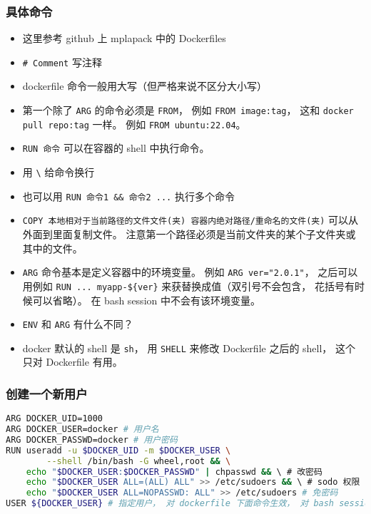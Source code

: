 \subsubsection{具体命令}
\begin{itemize}
\item 这里参考 github 上 mplapack 中的 Dockerfiles
\item \verb`# Comment` 写注释
\item dockerfile 命令一般用大写（但严格来说不区分大小写）
\item 第一个除了 \verb`ARG` 的命令必须是 \verb`FROM`， 例如 \verb`FROM image:tag`， 这和 \verb`docker pull repo:tag` 一样。 例如 \verb`FROM ubuntu:22.04`。
\item \verb`RUN 命令` 可以在容器的 shell 中执行命令。
\item 用 \verb`\` 给命令换行
\item 也可以用 \verb`RUN 命令1 && 命令2 ...` 执行多个命令
\item \verb`COPY 本地相对于当前路径的文件文件(夹) 容器内绝对路径/重命名的文件(夹)` 可以从外面到里面复制文件。 注意第一个路径必须是当前文件夹的某个子文件夹或其中的文件。
\item \verb`ARG` 命令基本是定义容器中的环境变量。 例如 \verb`ARG ver="2.0.1"`， 之后可以用例如 \verb`RUN ... myapp-${ver}` 来获替换成值（双引号不会包含， 花括号有时候可以省略）。 在 bash session 中不会有该环境变量。
\item \verb`ENV` 和 \verb`ARG` 有什么不同？
\item docker 默认的 shell 是 \verb`sh`， 用 \verb`SHELL` 来修改 Dockerfile 之后的 shell， 这个只对 Dockerfile 有用。
\end{itemize}

\subsubsection{创建一个新用户}
\begin{lstlisting}[language=bash]
ARG DOCKER_UID=1000
ARG DOCKER_USER=docker # 用户名
ARG DOCKER_PASSWD=docker # 用户密码
RUN useradd -u $DOCKER_UID -m $DOCKER_USER \
        --shell /bin/bash -G wheel,root && \
    echo "$DOCKER_USER:$DOCKER_PASSWD" | chpasswd && \ # 改密码
    echo "$DOCKER_USER ALL=(ALL) ALL" >> /etc/sudoers && \ # sodo 权限
    echo "$DOCKER_USER ALL=NOPASSWD: ALL" >> /etc/sudoers # 免密码
USER ${DOCKER_USER} # 指定用户， 对 dockerfile 下面命令生效， 对 bash session 生效。
\end{lstlisting}


